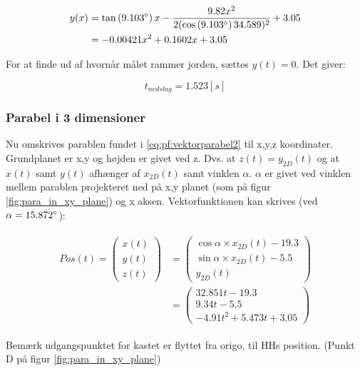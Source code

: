 \begin{align}
\begin{split}
y(x) &= \tan \left(9.103 \degree \right) x - \frac{9.82x^2}{2(\cos \left(9.103 \degree \right) 34.589)^2} + 3.05 \\
&= - 0.00421 x^2 + 0.1602 x  + 3.05
\label{eq:pf:y(x)3}
\end{split}
\end{align}

For at finde ud af hvornår målet rammer jorden, sættes $y(t) = 0$. Det giver:

\begin{equation}
t_{nedslag} = 1.523 [s]
\label{eq:pf:nedslagstid}
\end{equation}

\subsubsection{Parabel i 3 dimensioner}
Nu omskrives parablen fundet i \ref{eq:pf:vektorparabel2} til x,y,z koordinater. 
Grundplanet er x,y og højden er givet ved z. Dvs. at $z(t) = y_{2D}(t)$ og at $x(t)$ samt $y(t)$ afhænger af $x_{2D}(t)$ samt vinklen $\alpha$. 
$\alpha$ er givet ved vinklen mellem parablen projekteret ned på x,y planet (som på figur \ref{fig:para_in_xy_plane}) og x aksen. 
Vektorfunktionen kan skrives (ved $\alpha = 15.872 \degree$): 

\begin{align}
\begin{split}
Pos(t) = \left( \begin{array}{c}
	x(t) \\
	y(t) \\
	z(t)
	\end{array}
	\right)
	&= \left( \begin{array}{c}
	\cos \alpha \times x_{2D}(t) - 19.3 \\
	\sin \alpha \times x_{2D}(t) - 5.5 \\
	y_{2D}(t)
	\end{array}
	\right) \\
	&= \left( \begin{array}{c}
	32.851 t - 19.3 \\
	9.34 t - 5.5 \\
	- 4.91 t^2 + 5.473 t + 3.05
	\end{array}
	\right)
\label{eq:pf:vektorparabel3d}
\end{split}
\end{align}



Bemærk udgangspunktet for kastet er flyttet fra origo, til HHs position. (Punkt D på figur \ref{fig:para_in_xy_plane})
